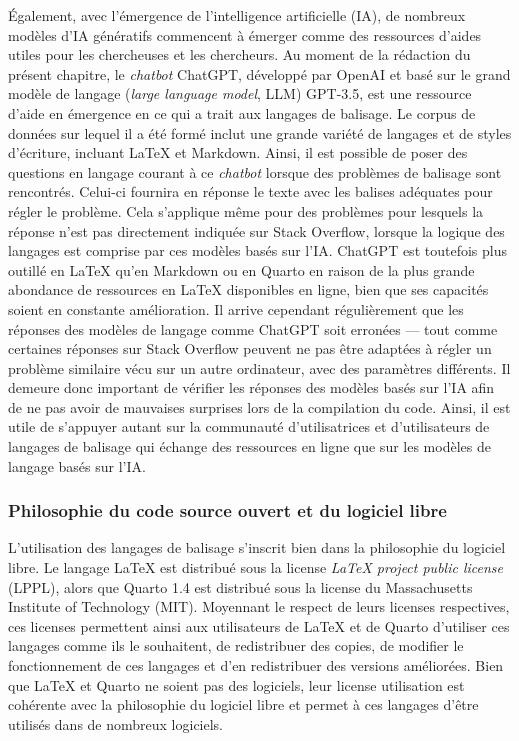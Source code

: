 \documentclass[
  letterpaper,
  DIV=11,
  numbers=noendperiod]{scrreprt}
\begin{document}
Également, avec l'émergence de l'intelligence artificielle (IA), de
nombreux modèles d'IA génératifs commencent à émerger comme des
ressources d'aides utiles pour les chercheuses et les chercheurs. Au
moment de la rédaction du présent chapitre, le \emph{chatbot} ChatGPT,
développé par OpenAI et basé sur le grand modèle de langage (\emph{large
language model}, LLM) GPT-3.5, est une ressource d'aide en émergence en
ce qui a trait aux langages de balisage. Le corpus de données sur lequel
il a été formé inclut une grande variété de langages et de styles
d'écriture, incluant LaTeX et Markdown. Ainsi, il est possible de poser
des questions en langage courant à ce \emph{chatbot} lorsque des
problèmes de balisage sont rencontrés. Celui-ci fournira en réponse le
texte avec les balises adéquates pour régler le problème. Cela
s'applique même pour des problèmes pour lesquels la réponse n'est pas
directement indiquée sur Stack Overflow, lorsque la logique des langages
est comprise par ces modèles basés sur l'IA. ChatGPT est toutefois plus
outillé en LaTeX qu'en Markdown ou en Quarto en raison de la plus grande
abondance de ressources en LaTeX disponibles en ligne, bien que ses
capacités soient en constante amélioration. Il arrive cependant
régulièrement que les réponses des modèles de langage comme ChatGPT soit
erronées --- tout comme certaines réponses sur Stack Overflow peuvent ne
pas être adaptées à régler un problème similaire vécu sur un autre
ordinateur, avec des paramètres différents. Il demeure donc important de
vérifier les réponses des modèles basés sur l'IA afin de ne pas avoir de
mauvaises surprises lors de la compilation du code. Ainsi, il est utile
de s'appuyer autant sur la communauté d'utilisatrices et d'utilisateurs
de langages de balisage qui échange des ressources en ligne que sur les
modèles de langage basés sur l'IA.

\subsubsection{Philosophie du code source ouvert et du logiciel
libre}\label{philosophie-du-code-source-ouvert-et-du-logiciel-libre}

L'utilisation des langages de balisage s'inscrit bien dans la
philosophie du logiciel libre. Le langage LaTeX est distribué sous la
license \emph{LaTeX project public license} (LPPL), alors que Quarto 1.4
est distribué sous la license du Massachusetts Institute of Technology
(MIT). Moyennant le respect de leurs licenses respectives, ces licenses
permettent ainsi aux utilisateurs de LaTeX et de Quarto d'utiliser ces
langages comme ils le souhaitent, de redistribuer des copies, de
modifier le fonctionnement de ces langages et d'en redistribuer des
versions améliorées. Bien que LaTeX et Quarto ne soient pas des
logiciels, leur license utilisation est cohérente avec la philosophie du
logiciel libre et permet à ces langages d'être utilisés dans de nombreux
logiciels.
\end{document}
